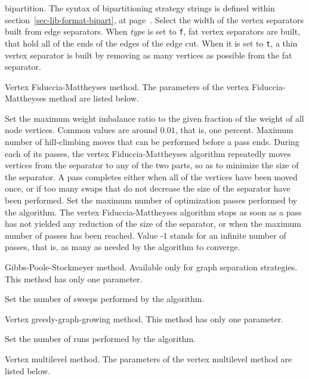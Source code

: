 \begin{itemize}
\begin{itemize}
bipartition. The syntax of bipartitioning
strategy strings is defined within section~\ref{sec-lib-format-bipart},
at page~\pageref{sec-lib-format-bipart}.
\iteme[{\tt width=}{\it type}]
Select the width of the vertex separators built from edge separators.
When {\it type\/} is set to {\tt f}, fat vertex separators are built,
that hold all of the ends of the edges of the edge cut. When it is set
to {\tt t}, a thin vertex separator is built by removing as many
vertices as possible from the fat separator.
\end{itemize}
\iteme[{\tt f}]
Vertex Fiduccia-Mattheyses method. The parameters of the vertex
Fiduccia-Mattheyses method are listed below.
\begin{itemize}
\iteme[{\tt bal=}{\it rat}]
Set the maximum weight imbalance ratio to the given fraction of
the weight of all node vertices. Common values are around $0.01$,
that is, one percent.
\iteme[{\tt move=}{\it nbr}]
Maximum number of hill-climbing moves that can be performed before a
pass ends. During each of its passes, the vertex Fiduccia-Mattheyses
algorithm repeatedly moves vertices from the separator to any of the
two parts, so as to minimize the size of the separator. A pass
completes either when all of the vertices have been moved once, or if
too many swaps that do not decrease the size of the separator have
been performed.
\iteme[{\tt pass=}{\it nbr}]
Set the maximum number of optimization passes performed by the
algorithm. The vertex Fiduccia-Mattheyses algorithm stops as soon as a
pass has not yielded any reduction of the size of the separator, or
when the maximum number of passes has been reached. Value -1 stands
for an infinite number of passes, that is, as many as needed by the
algorithm to converge.
\end{itemize}
\iteme[{\tt g}]
Gibbs-Poole-Stockmeyer method. Available only for graph separation strategies.
This method has only one parameter.
\begin{itemize}
\iteme[{\tt pass=}{\it nbr}]
Set the number of sweeps performed by the algorithm.
\end{itemize}
\iteme[{\tt h}]
Vertex greedy-graph-growing method. This method has only one parameter.
\begin{itemize}
\iteme[{\tt pass=}{\it nbr}]
Set the number of runs performed by the algorithm.
\end{itemize}
\iteme[{\tt m}]
Vertex multilevel method. The parameters of the vertex
multilevel method are listed below.
\begin{itemize}
\iteme[{\tt asc=}{\it strat}]

\end{itemize}
\end{itemize}
